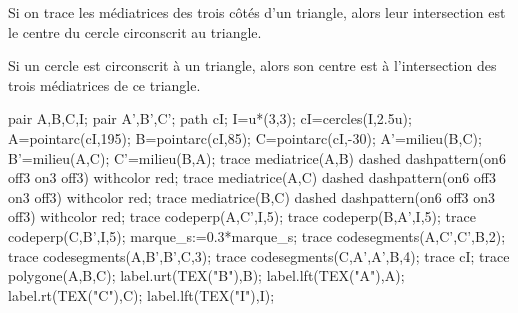 \begin{changemargin}{0mm}{-15mm}
    \begin{minipage}{0.7\linewidth}
        \begin{propriete}[\admise]
            Si on trace les médiatrices des trois côtés d'un triangle, alors leur intersection est le centre du cercle circonscrit au triangle.
        \end{propriete}
        \begin{propriete}[\admise]
            Si un cercle est circonscrit à un triangle, alors son centre est à l'intersection des trois médiatrices de ce triangle.
        \end{propriete}
    \end{minipage}
    \begin{minipage}{0.3\linewidth}
        \begin{Geometrie}[CoinHD={(6u,6u)}]
            pair A,B,C,I;
            pair A',B',C';
            path cI;
            I=u*(3,3);
            cI=cercles(I,2.5u);
            A=pointarc(cI,195);
            B=pointarc(cI,85);
            C=pointarc(cI,-30);
            A'=milieu(B,C);
            B'=milieu(A,C);
            C'=milieu(B,A);
            trace mediatrice(A,B) dashed dashpattern(on6 off3 on3 off3) withcolor red;
            trace mediatrice(A,C) dashed dashpattern(on6 off3 on3 off3) withcolor red;
            trace mediatrice(B,C) dashed dashpattern(on6 off3 on3 off3) withcolor red;
            trace codeperp(A,C',I,5);
            trace codeperp(B,A',I,5);
            trace codeperp(C,B',I,5);
            marque_s:=0.3*marque_s;
            trace codesegments(A,C',C',B,2);
            trace codesegments(A,B',B',C,3);
            trace codesegments(C,A',A',B,4);
            trace cI;
            trace polygone(A,B,C);
            label.urt(TEX("B"),B);
            label.lft(TEX("A"),A);
            label.rt(TEX("C"),C);
            label.lft(TEX("I"),I);
        \end{Geometrie}
    \end{minipage}


\end{changemargin}
